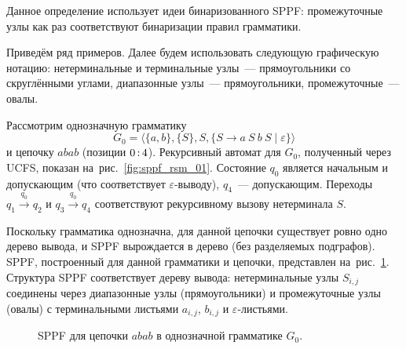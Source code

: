Данное определение использует идеи бинаризованного SPPF: промежуточные узлы как раз соответствуют бинаризации правил грамматики.

Приведём ряд примеров.
Далее будем использовать следующую графическую нотацию: нетерминальные и терминальные узлы~--- прямоугольники со скруглёнными углами,
диапазонные узлы~--- прямоугольники, промежуточные~--- овалы.

\begin{example}
	\label{exmpl:sppf_unambiguous}
	Рассмотрим однозначную грамматику
	\[
	G_0 = \langle \{a,b\}, \{S\}, S, \{S \to a \ S \ b \ S \mid \varepsilon\} \rangle
	\]
	и цепочку $abab$ (позиции $0 \rng 4$).
	Рекурсивный автомат для $G_0$, полученный через UCFS, показан на~рис.~\ref{fig:sppf_rsm_01}.
	Состояние $q_0$ является начальным и допускающим (что соответствует $\varepsilon$-выводу), $q_4$~--- допускающим.
	Переходы $q_1 \xrightarrow{q_0} q_2$ и $q_3 \xrightarrow{q_0} q_4$ соответствуют рекурсивному вызову нетерминала $S$.

	\begin{marginfigure}
		\begin{center}
			\resizebox{\marginparwidth}{!}{}
		\end{center}
		\caption{Рекурсивный автомат для грамматики $G_0$: $S \to aSbS \mid \varepsilon$.}
		\label{fig:sppf_rsm_01}
	\end{marginfigure}

	Поскольку грамматика однозначна, для данной цепочки существует ровно одно дерево вывода, и SPPF вырождается в дерево (без разделяемых подграфов).
	SPPF, построенный для данной грамматики и цепочки, представлен на~рис.~\ref{fig:sppf_01}.
	Структура SPPF соответствует дереву вывода: нетерминальные узлы $S_{i,j}$ соединены через диапазонные узлы (прямоугольники) и промежуточные узлы (овалы) с терминальными листьями $a_{i,j}$, $b_{i,j}$ и $\varepsilon$-листьями.

	\begin{figure}[H]
		\begin{center}
			\resizebox{0.7\textwidth}{!}{}
		\end{center}
		\caption{SPPF для цепочки $abab$ в однозначной грамматике $G_0$.}
		\label{fig:sppf_01}
	\end{figure}
\end{example}

